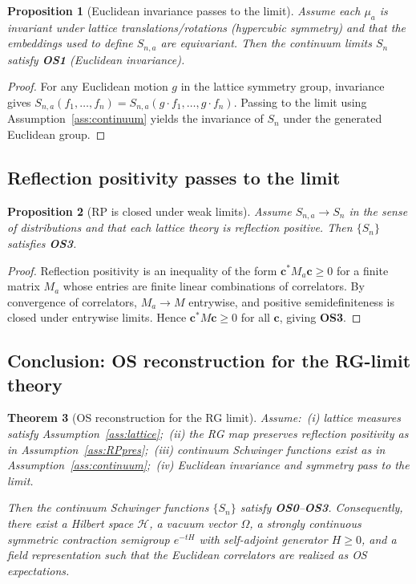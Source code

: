 \documentclass[11pt]{article}
\newtheorem{theorem}{Theorem}[section]
\newtheorem{proposition}[theorem]{Proposition}
\theoremstyle{definition}
\newcommand{\1}{\mathbf{1}}
\newcommand{\cH}{\mathcal{H}}
\begin{document}
\begin{proposition}[Euclidean invariance passes to the limit]
Assume each \(\mu_a\) is invariant under lattice translations/rotations (hypercubic symmetry) and that the embeddings used to define \(S_{n,a}\) are equivariant. Then the continuum limits \(S_n\) satisfy \textbf{OS1} (Euclidean invariance).
\end{proposition}

\begin{proof}
For any Euclidean motion \(g\) in the lattice symmetry group, invariance gives \(S_{n,a}(f_1,\dots,f_n)=S_{n,a}(g\cdot f_1,\dots,g\cdot f_n)\). Passing to the limit using Assumption~\ref{ass:continuum} yields the invariance of \(S_n\) under the generated Euclidean group.
\end{proof}

\subsection{Reflection positivity passes to the limit}

\begin{proposition}[RP is closed under weak limits]
Assume \(S_{n,a}\to S_n\) in the sense of distributions and that each lattice theory is reflection positive. Then \(\{S_n\}\) satisfies \textbf{OS3}.
\end{proposition}

\begin{proof}
Reflection positivity is an inequality of the form \(\mathbf{c}^* M_a \mathbf{c}\ge 0\) for a finite matrix \(M_a\) whose entries are finite linear combinations of correlators. By convergence of correlators, \(M_a\to M\) entrywise, and positive semidefiniteness is closed under entrywise limits. Hence \(\mathbf{c}^* M \mathbf{c}\ge 0\) for all \(\mathbf{c}\), giving \textbf{OS3}.
\end{proof}

\subsection{Conclusion: OS reconstruction for the RG-limit theory}

\begin{theorem}[OS reconstruction for the RG limit]\label{thm:OS_flow}
Assume:\
(i) lattice measures satisfy Assumption~\ref{ass:lattice};\
(ii) the RG map preserves reflection positivity as in Assumption~\ref{ass:RPpres};\
(iii) continuum Schwinger functions exist as in Assumption~\ref{ass:continuum};\
(iv) Euclidean invariance and symmetry pass to the limit.

Then the continuum Schwinger functions \(\{S_n\}\) satisfy \textbf{OS0}--\textbf{OS3}. Consequently, there exist a Hilbert space \(\cH\), a vacuum vector \(\Omega\), a strongly continuous symmetric contraction semigroup \(e^{-tH}\) with self-adjoint generator \(H\ge 0\), and a field representation such that the Euclidean correlators are realized as OS expectations.
\end{theorem}
\end{document}
